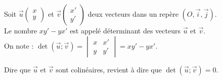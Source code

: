\begin{Définition}
Soit  $\overrightarrow{u}\begin{pmatrix} 
x \\
y
 \end{pmatrix}$ et $\overrightarrow{v}\begin{pmatrix} 
x' \\
y'
 \end{pmatrix}$ deux vecteurs dans un repère $(O,\overrightarrow{i},\overrightarrow{j})$.\\
 Le nombre $xy'-yx'$ est appelé déterminant des vecteurs $\overrightarrow{u}$ et $\overrightarrow{v}$.\\
 On note : $\det(\overrightarrow{u};\overrightarrow{v})=\begin{vmatrix}
 x & x' \\
 y & y'
 \end{vmatrix}=xy'-yx'$.

\end{Définition}

\begin{Propriété}
Dire que $\overrightarrow{u}$ et $\overrightarrow{v}$ sont colinéaires, revient à dire que $\det(\overrightarrow{u};\overrightarrow{v})=0$.

\end{Propriété}

